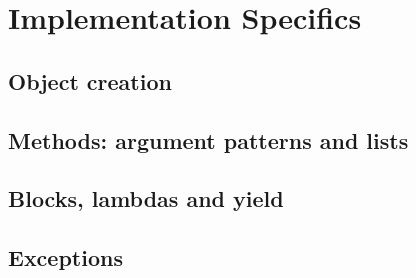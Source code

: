 \section{Implementation Specifics}

\subsection{Object creation}

\subsection{Methods: argument patterns and lists}

\subsection{Blocks, lambdas and yield}

\subsection{Exceptions}
